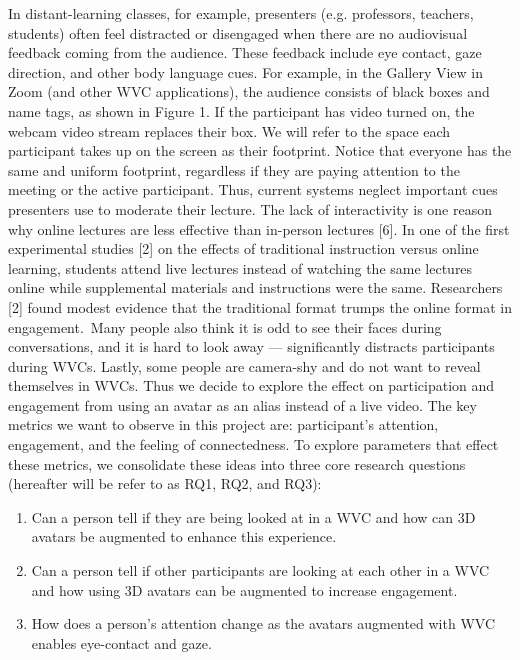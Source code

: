 \documentclass[sigconf,authordraft]{acmart}
\begin{document}
In distant-learning classes, for example, presenters (e.g. professors, teachers, students) often feel distracted or disengaged when there are no audiovisual feedback coming from the audience. These feedback include eye contact, gaze direction, and other body language cues.
For example, in the Gallery View in Zoom (and other WVC applications), the audience consists of black boxes  and name tags, as shown in Figure 1. If the participant has video turned on, the webcam video stream replaces their box. We will refer to the space each participant takes up on the screen as their footprint. Notice that everyone has the same and uniform footprint, regardless if they are paying attention to the meeting or the active participant. 
Thus, current systems neglect important cues presenters use to moderate their lecture. The lack of interactivity is one reason why online lectures are less effective than in-person lectures [6]. In one of the first experimental studies [2] on the effects of traditional instruction versus online learning, students attend live lectures instead of watching the same lectures online while supplemental materials and instructions were the same. Researchers [2] found modest evidence that the traditional format trumps the online format in engagement. Many people also think it is odd to see their faces during conversations, and it is hard to look away — significantly distracts participants during WVCs. 
Lastly, some people are camera-shy and do not want to reveal themselves in WVCs. Thus we decide to explore the effect on participation and engagement from using an avatar as an alias instead of  a live video.
The key metrics we want to observe in this project are: participant’s attention, engagement, and the feeling of connectedness. To explore parameters that effect these metrics, we consolidate these ideas into three core research questions (hereafter will be refer to as RQ1, RQ2, and RQ3):
\newline
\begin{enumerate}
\item Can a person tell if they are being looked at in a WVC and how can 3D avatars be augmented to enhance this experience.
\item Can a person tell if other participants are looking at each other in a WVC and how using 3D avatars can be augmented to increase engagement.
\item How does a person’s attention change as the avatars augmented with WVC enables eye-contact and gaze.
\end{enumerate}
\end{document}
